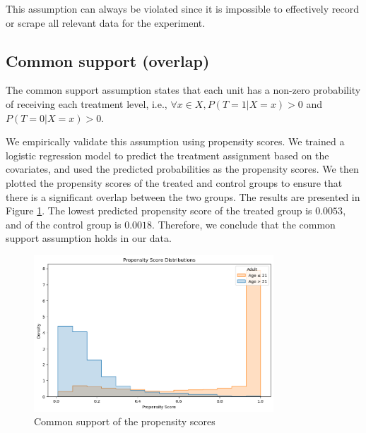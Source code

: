 \documentclass[11pt]{article}
\newcommand{\gur}[1]{{\color{teal}{Gur: #1}}}
\begin{document}
\gur{'We close with a reminder to readers of the optimistic view of the complexity of data and how correlation between observed variables and unmeasured ones can reduce any bias associated with unmeasured information.' https://www.ncbi.nlm.nih.gov/pmc/articles/PMC10666970/}

This assumption can always be violated since it is impossible to effectively record or scrape all relevant data for the experiment. 

\subsection{Common support (overlap)}

The common support assumption states that each unit has a non-zero probability of receiving each treatment level, i.e., $\forall x \in X, P(T=1|X=x) > 0$ and $P(T=0|X=x) > 0$.

We empirically validate this assumption using propensity scores. We trained a logistic regression model to predict the treatment assignment based on the covariates, and used the predicted probabilities as the propensity scores. We then plotted the propensity scores of the treated and control groups to ensure that there is a significant overlap between the two groups. The results are presented in Figure \ref{fig:common_support}. The lowest predicted propensity score of the treated group is $0.0053$, and of the control group is $0.0018$. Therefore, we conclude that the common support assumption holds in our data.

\begin{figure}
    \centering
    \caption{Common support of the propensity scores}
    \label{fig:common_support}
    \includegraphics[width = 0.8\textwidth]{images/common support propensity graph.png}
\end{figure}
\end{document}
